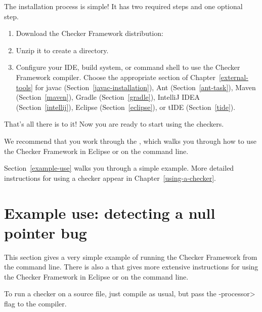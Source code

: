 The installation process is simple!  It has two required steps and one
optional step.
\begin{enumerate}
\item
  Download the Checker Framework distribution:
  \\

\item 
  Unzip it to create a  directory.

\item
  \label{installation-configure-step}
  Configure your IDE, build system, or command shell to use the Checker
  Framework compiler.  Choose the appropriate section of
  Chapter~\ref{external-tools} for
javac (Section~\ref{javac-installation}),
Ant (Section~\ref{ant-task}),
Maven (Section~\ref{maven}),
Gradle (Section~\ref{gradle}),
IntelliJ IDEA (Section~\ref{intellij}),
Eclipse (Section~\ref{eclipse}),
or
tIDE (Section~\ref{tide}).


\end{enumerate}

That's all there is to it!  Now you are ready to start using the checkers.

We recommend that you work through the
, which walks you through how to use the Checker
Framework in Eclipse or on
the command line.

Section~\ref{example-use} walks you through a simple example.  More detailed
instructions for using a checker appear in Chapter~\ref{using-a-checker}.



\section{Example use:  detecting a null pointer bug\label{example-use}}

This section gives a very simple example of running the Checker Framework
from the command line.  There is also a 
that gives more extensive instructions for using the Checker Framework in
Eclipse or on the command line.


To run a checker on a source file, just compile as usual, but pass the
\<-processor> flag to the compiler.

